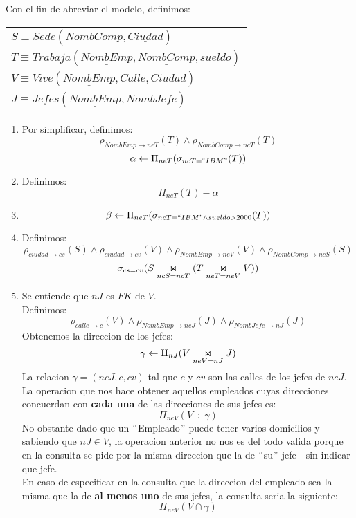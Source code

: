 Con el fin de abreviar el modelo, definimos:
\begin{center}
	\begin{tabular}{l}
		$S \equiv Sede(\underline{NombComp}, \underline{Ciudad})$\\
		$T \equiv Trabaja(\underline{NombEmp}, \underline{NombComp}, sueldo)$\\
		$V \equiv Vive(\underline{NombEmp}, Calle, Ciudad)$\\
		$J \equiv Jefes(\underline{NombEmp}, \underline{NombJefe})$\\
	\end{tabular}
\end{center}
\begin{enumerate}
	\item Por simplificar, definimos:
	$$\rho_{NombEmp\rightarrow neT} (T) \land \rho_{NombComp\rightarrow ncT} (T)$$
	$$\alpha \leftarrow \Pi_{neT}(\sigma_{ncT = ``IBM"} (T))$$
	
	\item Definimos:
	$$\Pi_{neT}(T)-\alpha$$
	
	\item 
	$$\beta \leftarrow \Pi_{neT}(\sigma_{ncT = ``IBM" \land sueldo > 2000}(T))$$
	
	\item Definimos:
	$$\rho_{ciudad \rightarrow cs} (S) \land \rho_{ciudad \rightarrow cv}(V) \land \rho_{NombEmp\rightarrow neV} (V) \land \rho_{NombComp\rightarrow ncS} (S)$$
	$$\sigma_{cs = cv}(S\innerjoin[ncS = ncT] (T\innerjoin[neT = neV] V))$$
	
	\item Se entiende que $nJ$ es $FK$ de $V$.\\ 
	Definimos:
	$$\rho_{calle\rightarrow c}(V) \land \rho_{NombEmp\rightarrow neJ}(J) \land \rho_{NombJefe \rightarrow nJ}(J)$$
	Obtenemos la direccion de los jefes:
	$$\gamma \leftarrow \amalg_{nJ}(V \innerjoin[neV = nJ] J)$$
	La relacion $\gamma = (\underline{neJ}, \underline{c}, \underline{cv})$ tal que $c$ y $cv$ son las calles de los jefes de $neJ$.\\
	La operacion que nos hace obtener aquellos empleados cuyas direcciones concuerdan con \textbf{cada una} de las direcciones de sus jefes es:
	$$\Pi_{neV} (V \div \gamma)$$
	No obstante dado que un $``$Empleado$"$  puede tener varios domicilios y sabiendo que $nJ \in V$, la operacion anterior no nos es del todo valida porque en la consulta se pide por la misma direccion que la de $``$su$"$ jefe - sin indicar que jefe.\\
	En caso de especificar en la consulta que la direccion del empleado sea la misma que la de \textbf{al menos uno} de sus jefes, la consulta seria la siguiente:
	$$\Pi_{neV}(V\cap \gamma)$$
	

\end{enumerate}
